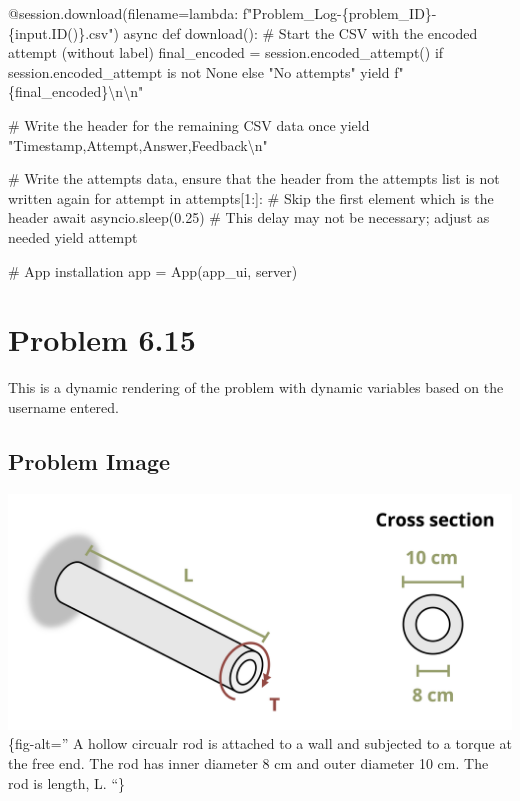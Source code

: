\documentclass[
  letterpaper,
  DIV=11,
  numbers=noendperiod]{scrreprt}
\newenvironment{Shaded}{\begin{snugshade}}{\end{snugshade}}
\newcommand{\NormalTok}[1]{\textcolor[rgb]{0.00,0.23,0.31}{#1}}
\begin{document}
\begin{Shaded}
\begin{Highlighting}[]
\NormalTok{    @session.download(filename=lambda: f"Problem\_Log{-}\{problem\_ID\}{-}\{input.ID()\}.csv")}
\NormalTok{    async def download():}
\NormalTok{        \# Start the CSV with the encoded attempt (without label)}
\NormalTok{        final\_encoded = session.encoded\_attempt() if session.encoded\_attempt is not None else "No attempts"}
\NormalTok{        yield f"\{final\_encoded\}\textbackslash{}n\textbackslash{}n"}
        
\NormalTok{        \# Write the header for the remaining CSV data once}
\NormalTok{        yield "Timestamp,Attempt,Answer,Feedback\textbackslash{}n"}
        
\NormalTok{        \# Write the attempts data, ensure that the header from the attempts list is not written again}
\NormalTok{        for attempt in attempts[1:]:  \# Skip the first element which is the header}
\NormalTok{            await asyncio.sleep(0.25)  \# This delay may not be necessary; adjust as needed}
\NormalTok{            yield attempt}


\NormalTok{\# App installation}
\NormalTok{app = App(app\_ui, server)}
\end{Highlighting}
\end{Shaded}

\chapter*{Problem 6.15}\label{problem-6.15}


This is a dynamic rendering of the problem with dynamic variables based
on the username entered.

\section*{Problem Image}\label{problem-image-46}


\includegraphics{images/274.png}\{fig-alt='' A hollow circualr rod is
attached to a wall and subjected to a torque at the free end. The rod
has inner diameter 8 cm and outer diameter 10 cm. The rod is length, L.
``\}
\end{document}
